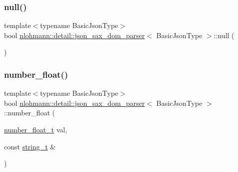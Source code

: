 \mbox{\label{classnlohmann_1_1detail_1_1json__sax__dom__parser_abb06babaa861f123d8d0cb443b887d8a}} 
\subsubsection{\texorpdfstring{null()}{null()}}
{\footnotesize\ttfamily template$<$typename Basic\+Json\+Type$>$ \\
bool \mbox{\hyperlink{classnlohmann_1_1detail_1_1json__sax__dom__parser}{nlohmann\+::detail\+::json\+\_\+sax\+\_\+dom\+\_\+parser}}$<$ Basic\+Json\+Type $>$\+::null (\begin{DoxyParamCaption}{ }\end{DoxyParamCaption})\hspace{0.3cm}{\ttfamily [inline]}}

\mbox{\label{classnlohmann_1_1detail_1_1json__sax__dom__parser_aef4652c0e81d6c052acb5d36afe09499}} 
\subsubsection{\texorpdfstring{number\_float()}{number\_float()}}
{\footnotesize\ttfamily template$<$typename Basic\+Json\+Type$>$ \\
bool \mbox{\hyperlink{classnlohmann_1_1detail_1_1json__sax__dom__parser}{nlohmann\+::detail\+::json\+\_\+sax\+\_\+dom\+\_\+parser}}$<$ Basic\+Json\+Type $>$\+::number\+\_\+float (\begin{DoxyParamCaption}\item[{\mbox{\hyperlink{classnlohmann_1_1detail_1_1json__sax__dom__parser_ad8da3aad0147b18b3cb76868480300fe}{number\+\_\+float\+\_\+t}}}]{val,  }\item[{const \mbox{\hyperlink{classnlohmann_1_1detail_1_1json__sax__dom__parser_afd4d961ab2a6b01cbe6e840f7fb90cdc}{string\+\_\+t}} \&}]{ }\end{DoxyParamCaption})\hspace{0.3cm}{\ttfamily [inline]}}

